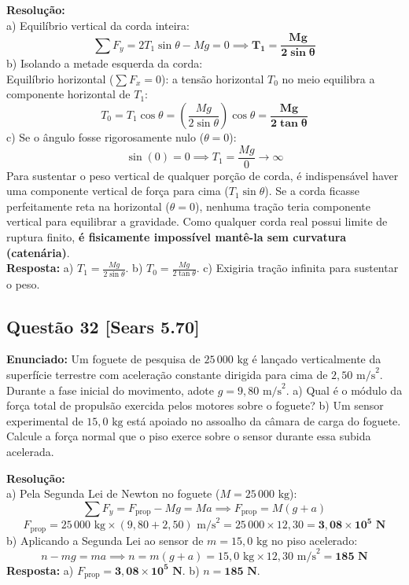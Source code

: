\documentclass[11pt,a4paper]{article}
\begin{document}
\noindent
\textbf{Resolução:}\\
a) Equilíbrio vertical da corda inteira:
\[ \sum F_y = 2 T_1 \sin\theta - Mg = 0 \implies \mathbf{T_1 = \frac{Mg}{2\sin\theta}} \]
b) Isolando a metade esquerda da corda:\\
Equilíbrio horizontal ($\sum F_x = 0$): a tensão horizontal $T_0$ no meio equilibra a componente horizontal de $T_1$:
\[ T_0 = T_1 \cos\theta = \left(\frac{Mg}{2\sin\theta}\right)\cos\theta = \mathbf{\frac{Mg}{2\tan\theta}} \]
c) Se o ângulo fosse rigorosamente nulo ($\theta = 0$):
\[ \sin(0) = 0 \implies T_1 = \frac{Mg}{0} \to \infty \]
Para sustentar o peso vertical de qualquer porção de corda, é indispensável haver uma componente vertical de força para cima ($T_1\sin\theta$). Se a corda ficasse perfeitamente reta na horizontal ($\theta=0$), nenhuma tração teria componente vertical para equilibrar a gravidade. Como qualquer corda real possui limite de ruptura finito, \textbf{é fisicamente impossível mantê-la sem curvatura (catenária)}.\\
\textbf{Resposta:} a) $T_1 = \frac{Mg}{2\sin\theta}$. b) $T_0 = \frac{Mg}{2\tan\theta}$. c) Exigiria tração infinita para sustentar o peso.

\vspace{0.3cm}
\subsection*{Questão 32 [Sears 5.70]}
\textbf{Enunciado:} Um foguete de pesquisa de $25\,000\text{ kg}$ é lançado verticalmente da superfície terrestre com aceleração constante dirigida para cima de $2,50\text{ m/s}^2$. Durante a fase inicial do movimento, adote $g = 9,80\text{ m/s}^2$. a) Qual é o módulo da força total de propulsão exercida pelos motores sobre o foguete? b) Um sensor experimental de $15,0\text{ kg}$ está apoiado no assoalho da câmara de carga do foguete. Calcule a força normal que o piso exerce sobre o sensor durante essa subida acelerada.

\noindent
\textbf{Resolução:}\\
a) Pela Segunda Lei de Newton no foguete ($M = 25\,000\text{ kg}$):
\[ \sum F_y = F_{\text{prop}} - Mg = M a \implies F_{\text{prop}} = M(g + a) \]
\[ F_{\text{prop}} = 25\,000\text{ kg} \times (9,80 + 2,50)\text{ m/s}^2 = 25\,000 \times 12,30 = \mathbf{3,08 \times 10^5\text{ N}} \]
b) Aplicando a Segunda Lei ao sensor de $m = 15,0\text{ kg}$ no piso acelerado:
\[ n - mg = m a \implies n = m(g + a) = 15,0\text{ kg} \times 12,30\text{ m/s}^2 = \mathbf{185\text{ N}} \]
\textbf{Resposta:} a) $F_{\text{prop}} = \mathbf{3,08 \times 10^5\text{ N}}$. b) $n = \mathbf{185\text{ N}}$.
\end{document}
